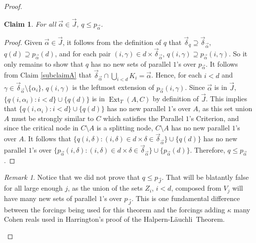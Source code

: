 \documentclass{amsart}
\newtheorem{claim}{Claim}
\theoremstyle{remark}
\newtheorem{rem}[thm]{Remark}
\theoremstyle{definition}
\theoremstyle{remark}
\newcommand{\al}{\alpha}
\newcommand{\contains}{\supseteq}
\DeclareMathOperator{\Ext}{Ext}
\newcommand{\POC}{Parallel $1$'s Criterion}
\newcommand{\Lauchli}{L{\"{a}}uchli}
\begin{document}
\begin{proof}
\begin{claim}\label{claim.qbelowpal}
For all $\vec\al\in\vec{J}$,
$q\le p_{\vec{\al}}$.
\end{claim}



\begin{proof}
Given  $\vec\al\in\vec{J}$,
it follows from the  definition of $q$ that
$\vec{\delta}_q\contains \vec{\delta}_{\vec{\al}}$,
$q(d)\contains p_{\vec{\al}}(d)$,
and
for each pair $(i,\gamma)\in d\times \vec{\delta}_{\vec\al}$,
$q(i,\gamma)\contains p_{\vec{\al}}(i,\gamma)$.
So it only remains to show that  $q$
has no new sets of parallel $1$'s over $p_{\vec{\al}}$.
It follows from  Claim \ref{subclaimA}
that
 $\vec{\delta}_{\vec\al}\cap
\bigcup_{i<d}K_i=\vec\al$.
Hence,
for  each $i<d$ and $\gamma\in\vec{\delta}_{\vec\al}\setminus \{\al_i\}$,
 $q(i,\gamma)$ is the leftmost extension of $p_{\vec\al}(i,\gamma)$.
Since $\vec\al$ is in $\vec{J}$,
$\{q(i,\al_i):i<d\}\cup\{q(d)\}$ is in $\Ext_T(A,C)$
by definition of $\vec{J}$.
This  implies that $\{q(i,\al_i):i<d\}\cup\{q(d)\}$
has no new parallel $1$'s over $A$, as this set union $A$ must be strongly similar to $C$ which satisfies the \POC, and since the critical node in $C\setminus A$ is a splitting node, $C\setminus A$ has no new parallel $1$'s over $A$.
It follows that
$\{q(i,\delta):(i,\delta)\in d\times\delta\in\vec{\delta}_{\vec\al}\}\cup\{q(d)\}$
has no new  parallel $1$'s  over
$\{p_{\vec\al}(i,\delta):(i,\delta)\in d\times\delta\in\vec{\delta}_{\vec\al}\}\cup\{p_{\vec\al}(d)\}$.
Therefore, $q\le p_{\vec\al}$.
 \end{proof}


\begin{rem}
Notice that we did not prove that $q\le p_{\vec{J}}$.
That  will be blatantly false for  all  large enough $j$,
as   the union of the sets $Z_i$, $i<d$,  composed from $V_j$  will have   many new sets of parallel $1$'s over $p_{\vec{J}}$.
This is one fundamental difference between the forcings being used for this theorem
and the  forcings adding $\kappa$ many Cohen reals used in Harrington's  proof of the Halpern-\Lauchli\ Theorem.
\end{rem}










\end{proof}
\end{document}
